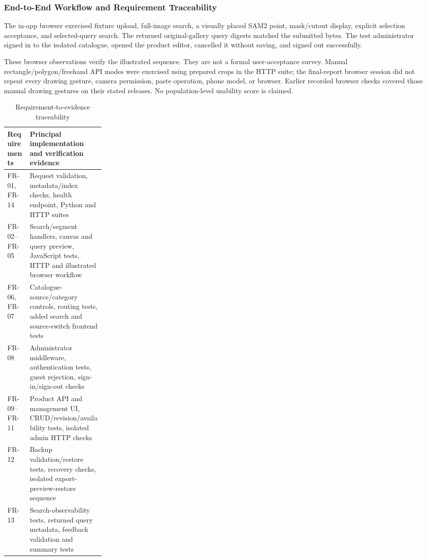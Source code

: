 \subsubsection{End-to-End Workflow and Requirement Traceability}
The in-app browser exercised fixture upload, full-image search, a visually placed
SAM2 point, mask/cutout display, explicit selection acceptance, and selected-query
search. The returned original-gallery query digests matched the submitted bytes.
The test administrator signed in to the isolated catalogue, opened the product
editor, cancelled it without saving, and signed out successfully.

These browser observations verify the illustrated sequence. They are not a formal
user-acceptance survey. Manual rectangle/polygon/freehand API modes were exercised
using prepared crops in the HTTP suite; the final-report browser session did not
repeat every drawing gesture, camera permission, paste operation, phone model,
or browser. Earlier recorded browser checks covered those manual drawing
gestures on their stated releases. No population-level usability score is claimed.
\begin{table}[H]\centering
\caption{Requirement-to-evidence traceability}
\label{tab:traceability}
\begin{ReportTable}
\begin{tabularx}{\linewidth}{@{}p{0.23\linewidth}Y@{}}
\toprule\textbf{Requirements}&\textbf{Principal implementation and verification evidence}\\\midrule
FR-01, FR-14 & Request validation, metadata/index checks, health endpoint, Python and HTTP suites \\ \addlinespace
FR-02--FR-05 & Search/segment handlers, canvas and query preview, JavaScript tests, HTTP and illustrated browser workflow \\ \addlinespace
FR-06, FR-07 & Catalogue-source/category controls, routing tests, added search and source-switch frontend tests \\ \addlinespace
FR-08 & Administrator middleware, authentication tests, guest rejection, sign-in/sign-out checks \\ \addlinespace
FR-09--FR-11 & Product API and management UI, CRUD/revision/availability tests, isolated admin HTTP checks \\ \addlinespace
FR-12 & Backup validation/restore tests, recovery checks, isolated export-preview-restore sequence \\ \addlinespace
FR-13 & Search-observability tests, returned query metadata, feedback validation and summary tests \\
\bottomrule
\end{tabularx}
\end{ReportTable}
\end{table}

